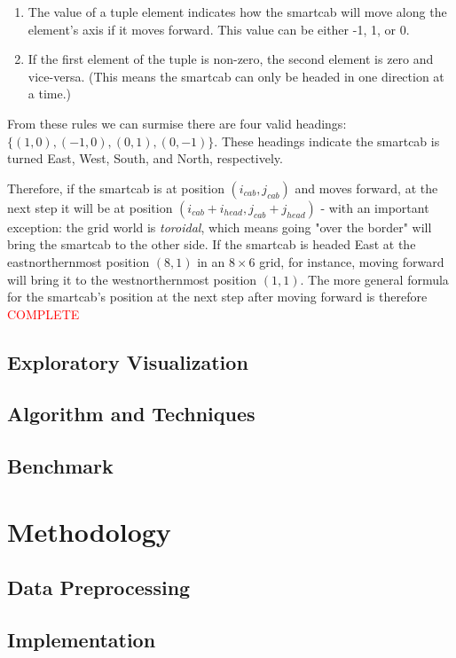 \documentclass{article}
\begin{document}
\begin{enumerate}
   \item The value of a tuple element indicates how the smartcab will move along the element's axis if it moves forward. This value can be either -1, 1, or 0.
   \item If the first element of the tuple is non-zero, the second element is zero and vice-versa. (This means the smartcab can only be headed in one direction at a time.)
\end{enumerate}

From these rules we can surmise there are four valid headings: $\{(1, 0), (-1, 0), (0, 1), (0, -1)\}$. These headings indicate the smartcab is turned East, West, South, and North, respectively.
 
Therefore, if the smartcab is at position $(i_{cab}, j_{cab})$ and moves forward, at the next step it will be at position $(i_{cab} + i_{head}, j_{cab} + j_{head})$ - with an important exception: the grid world is \textit{toroidal}, which means going "over the border" will bring the smartcab to the other side. If the smartcab is headed East at the eastnorthernmost position $(8, 1)$ in an $8\times6$ grid, for instance, moving forward will bring it to the westnorthernmost position $(1, 1)$. The more general formula for the smartcab's position at the next step after moving forward is therefore \textcolor{red}{COMPLETE}

\subsection{Exploratory Visualization}
\label{sec:explovis}
\subsection{Algorithm and Techniques}
\label{sec:algos}
\subsection{Benchmark}
\label{sec:benchmark}

\section{Methodology}

\subsection{Data Preprocessing}
\subsection{Implementation}
\end{document}
